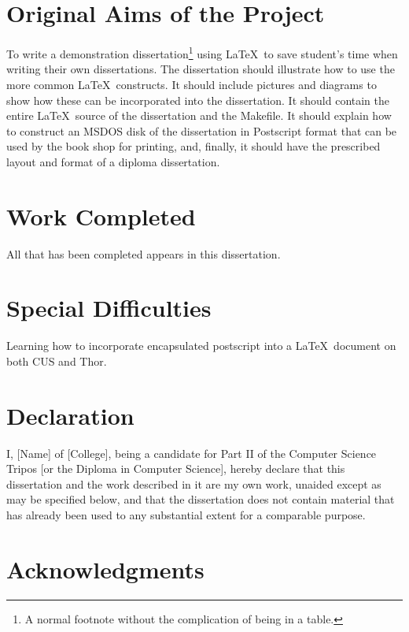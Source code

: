 \documentclass[12pt,twoside,notitlepage]{report}
\begin{document}
\section*{Original Aims of the Project}

To write a demonstration dissertation\footnote{A normal footnote without the
complication of being in a table.} using \LaTeX\ to save
student's time when writing their own dissertations. The dissertation
should illustrate how to use the more common \LaTeX\ constructs. It
should include pictures and diagrams to show how these can be
incorporated into the dissertation.  It should contain the entire
\LaTeX\ source of the dissertation and the Makefile.  It should
explain how to construct an MSDOS disk of the dissertation in
Postscript format that can be used by the book shop for printing, and,
finally, it should have the prescribed layout and format of a diploma
dissertation.


\section*{Work Completed}

All that has been completed appears in this dissertation.

\section*{Special Difficulties}

Learning how to incorporate encapsulated postscript into a \LaTeX\
document on both CUS and Thor.
 
\newpage
\section*{Declaration}

I, [Name] of [College], being a candidate for Part II of the Computer
Science Tripos [or the Diploma in Computer Science], hereby declare
that this dissertation and the work described in it are my own work,
unaided except as may be specified below, and that the dissertation
does not contain material that has already been used to any substantial
extent for a comparable purpose.

\bigskip
{}

\medskip
{}

\cleardoublepage

\tableofcontents

\newpage
\section*{Acknowledgments}
\end{document}
